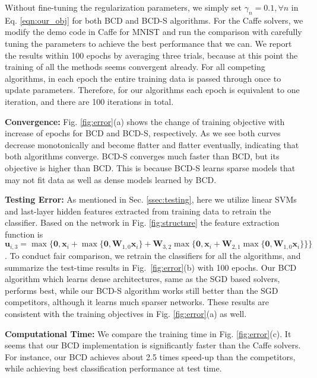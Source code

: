 \documentclass{article}
\begin{document}
Without fine-tuning the regularization parameters, we simply set $\gamma_n=0.1, \forall n$ in Eq. \ref{eqn:our_obj} for both BCD and BCD-S algorithms. For the Caffe solvers, we modify the demo code in Caffe for MNIST and run the comparison with carefully tuning the parameters %
to achieve the best performance that we can. We report the results within 100 epochs by averaging three trials, because at this point the training of all the methods seems convergent already. For all competing algorithms, in each epoch the entire training data is passed through once to update parameters. Therefore, for our algorithms each epoch is equivalent to one iteration, and there are 100 iterations in total.

{\bf Convergence:} Fig. \ref{fig:error}(a) shows the change of training objective with increase of epochs for BCD and BCD-S, respectively. As we see both curves decrease monotonically and become flatter and flatter eventually, indicating that both algorithms converge. BCD-S converges much faster than BCD, but its objective is higher than BCD. This is because BCD-S learns sparse models that may not fit data as well as dense models learned by BCD.




{\bf Testing Error:} As mentioned in Sec. \ref{ssec:testing}, here we utilize linear SVMs and last-layer hidden features extracted from training data to retrain the classifier. Based on the network in Fig. \ref{fig:structure} the feature extraction function is $\mathbf{u}_{i,3}=\max\{\mathbf{0}, \mathbf{x}_i+\max\{\mathbf{0}, \mathbf{W}_{1,0}\mathbf{x}_i\}+\mathbf{W}_{3,2}\max\{\mathbf{0}, \mathbf{x}_i+\mathbf{W}_{2,1}\max\{\mathbf{0}, \mathbf{W}_{1,0}\mathbf{x}_i\}\}\}$. 
To conduct fair comparison, we retrain the classifiers for all the algorithms, and summarize the test-time results in Fig.~\ref{fig:error}(b) with 100 epochs. Our BCD algorithm which learns dense architectures, same as the SGD based solvers, performs best, while our BCD-S algorithm works still better than the SGD competitors, although it learns much sparser networks. These results are consistent with the training objectives in Fig. \ref{fig:error}(a) as well.

{\bf Computational Time:} We compare the training time in Fig. \ref{fig:error}(c). It seems that our BCD implementation is significantly faster than the Caffe solvers. For instance, our BCD achieves about 2.5 times speed-up than the competitors, while achieving best classification performance at test time.
\end{document}
